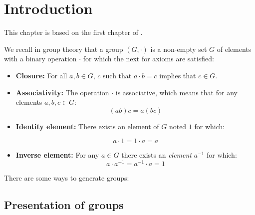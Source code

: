 \chapter{Introduction}

This chapter is based on the first chapter of \cite{magnusCombinatorialGroupTheory2004}.


We recall in group theory that a group $(G,\cdot)$ is a non-empty set $G$ of elements with a binary operation $\cdot$ for which the next for axioms are satisfied:

\begin{itemize}
  \item \textbf{Closure:} For all $a,b \in G$, $c$ such that $a\cdot b = c$ implies that $c \in G$.

  \item \textbf{Associativity:} The operation $\cdot$ is associative, which means that for any elements $a,b,c \in G$:
    $$(ab)c = a(bc)$$

  \item \textbf{Identity element:} There exists an element of $G$ noted $1$ for which:

  $$a\cdot 1 = 1\cdot a = a$$

  \item \textbf{Inverse element:} For any $a \in G$ there exists an \textit{element} $a^{-1}$ for which:
  $$ a\cdot a^{-1} = a^{-1} \cdot a = 1 $$
\end{itemize}

There are some ways to generate groups:

\section{Presentation of groups}
